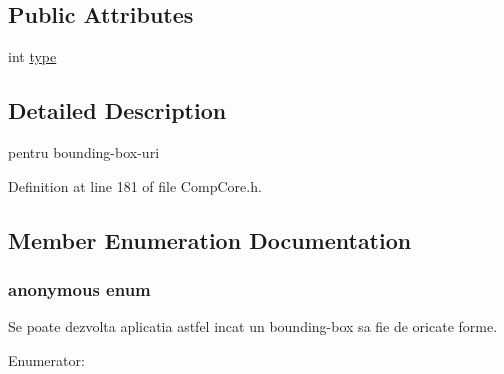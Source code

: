 \subsection*{Public Attributes}
\begin{DoxyCompactItemize}
\item 
int \hyperlink{class_bounding_box_a87e612000c8e4af69aa7c3060ff6e77d}{type}
\end{DoxyCompactItemize}


\subsection{Detailed Description}
pentru bounding-\/box-\/uri 

Definition at line 181 of file Comp\-Core.\-h.



\subsection{Member Enumeration Documentation}
\hypertarget{class_bounding_box_ac4eb5027a54b684f95999bea905ce3e1}{\subsubsection[{anonymous enum}]{\setlength{\rightskip}{0pt plus 5cm}anonymous enum}}\label{class_bounding_box_ac4eb5027a54b684f95999bea905ce3e1}


Se poate dezvolta aplicatia astfel incat un bounding-\/box sa fie de oricate forme. 

\begin{Desc}
\item[Enumerator\-: ]\par
\begin{description}
\item[{\em 
\hypertarget{class_bounding_box_ac4eb5027a54b684f95999bea905ce3e1a8d808e5d8708319c327450ed8cf4c335}{S\-P\-H\-E\-R\-E}\label{class_bounding_box_ac4eb5027a54b684f95999bea905ce3e1a8d808e5d8708319c327450ed8cf4c335}
}]\item[{\em 
\hypertarget{class_bounding_box_ac4eb5027a54b684f95999bea905ce3e1ada5242406c5801cdb1d436b277503853}{P\-A\-R\-A\-L\-L\-E\-L\-E\-P\-I\-P\-E\-D}\label{class_bounding_box_ac4eb5027a54b684f95999bea905ce3e1ada5242406c5801cdb1d436b277503853}
}]\end{description}
\end{Desc}




